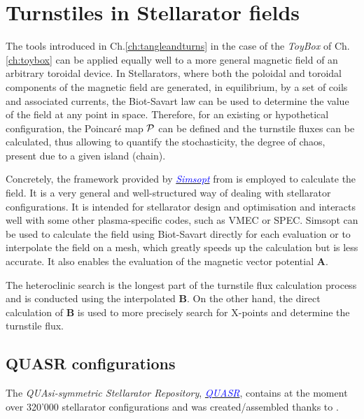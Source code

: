

\chapter{Turnstiles in Stellarator fields}

The tools introduced in Ch.\ref{ch:tangleandturns} in the case of the \textit{ToyBox} of Ch.\ref{ch:toybox} can be applied equally well to a more general magnetic field of an arbitrary toroidal device. In Stellarators, where both the poloidal and toroidal components of the magnetic field are generated, in equilibrium, by a set of coils and associated currents, the Biot-Savart law can be used to determine the value of the field at any point in space. Therefore, for an existing or hypothetical configuration, the Poincaré map $\mathcal{P}$ can be defined and the turnstile fluxes can be calculated, thus allowing to quantify the stochasticity, the degree of chaos, present due to a given island (chain).

Concretely, the framework provided by 
\href{https://simsopt.readthedocs.io/en/latest}{\textcolor{blue}{\textit{Simsopt}}} from \citeauthor{medasani_hiddensymmetriessimsopt_2024} is employed to calculate the field. It is a very general and well-structured way of dealing with stellarator configurations. It is intended for stellarator design and optimisation and interacts well with some other plasma-specific codes, such as VMEC or SPEC. Simsopt can be used to calculate the field using Biot-Savart directly for each evaluation or to interpolate the field on a mesh, which greatly speeds up the calculation but is less accurate. It also enables the evaluation of the magnetic vector potential $\textbf{A}$.

The heteroclinic search is the longest part of the turnstile flux calculation process and is conducted using the interpolated $\textbf{B}$. On the other hand, the direct calculation of $\textbf{B}$ is used to more precisely search for X-points and determine the turnstile flux.

\section{QUASR configurations}

The \textit{QUAsi-symmetric Stellarator Repository}, \href{https://quasr.flatironinstitute.org/}{\textcolor{blue}{\textit{QUASR}}}, contains at the moment over 320'000 stellarator configurations and was created/assembled thanks to \cite{andrew_giuliani_quasr_nodate}.

